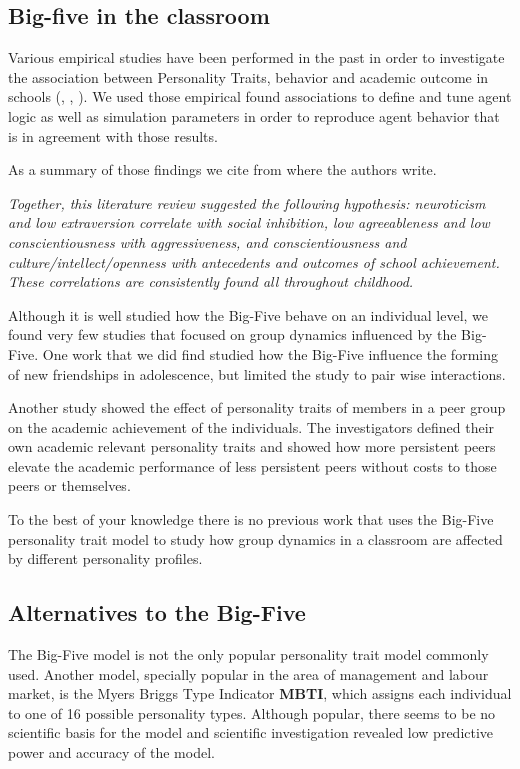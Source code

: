 \subsection{Big-five in the classroom}
Various empirical studies have been performed in the past in order to investigate
the association between Personality Traits, behavior and academic outcome in schools
(\cite{Ehrler1999}, \cite{Nigg2002}, \cite{Asendorpf2003}).
We used those empirical found associations to define and tune agent logic as well
as simulation parameters in order to reproduce agent behavior that is in agreement
with those results.

As a summary of those findings we cite from \cite{Asendorpf2003} where the authors
write.

\bb

\textit{Together, this literature review suggested the following hypothesis:
neuroticism and low extraversion correlate with social inhibition, low agreeableness
and low conscientiousness with aggressiveness, and conscientiousness and
culture/intellect/openness with antecedents and outcomes of school achievement.
These correlations are consistently found all throughout childhood.}

\bb

Although it is well studied how the Big-Five behave on an individual level, we
found very few studies that focused on group dynamics influenced by the
Big-Five. One work that we did find\cite{Selfhout2010} studied how the Big-Five
influence the forming of new friendships in adolescence, but limited the study
to pair wise interactions.

Another study \cite{Golsteyn2017} showed the effect of personality traits of members
in a peer group on the academic achievement of the individuals. The investigators
defined their own academic relevant personality traits and showed how more persistent
peers elevate the academic performance of less persistent peers without costs to
those peers or themselves.

To the best of your knowledge there is no previous work that uses the Big-Five
personality trait model to study how group dynamics in a classroom are affected
by different personality profiles.

\subsection{Alternatives to the Big-Five}
The Big-Five model is not the only popular personality trait model commonly used.
Another model, specially popular in the area of management and labour market, is the
Myers Briggs Type Indicator \textbf{MBTI}, which assigns each individual to one
of 16 possible personality types. Although popular, there seems to be no scientific
basis for the model and scientific investigation\cite{Pittenger1993}
revealed low predictive power and accuracy of the model.

